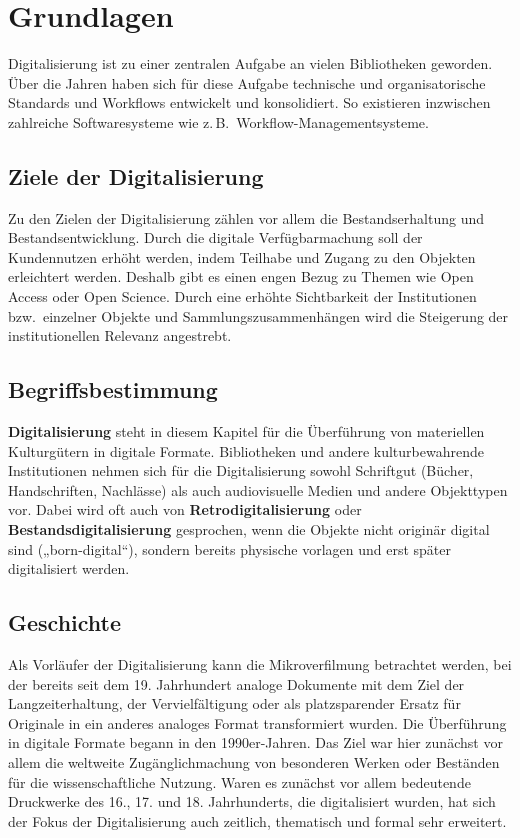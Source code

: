 \documentclass[
  11pt,
  letterpaper,
  DIV=11,
  twoside]{scrreprt}
\begin{document}
\section{Grundlagen}\label{grundlagen}

Digitalisierung ist zu einer zentralen Aufgabe an vielen Bibliotheken
geworden. Über die Jahren haben sich für diese Aufgabe technische und
organisatorische Standards und Workflows entwickelt und konsolidiert. So
existieren inzwischen zahlreiche Softwaresysteme wie
z.\,B.~Workflow-Managementsysteme.

\subsection{Ziele der Digitalisierung}\label{ziele-der-digitalisierung}

Zu den Zielen der Digitalisierung zählen vor allem die Bestandserhaltung
und Bestandsentwicklung. Durch die digitale Verfügbarmachung soll der
Kundennutzen erhöht werden, indem Teilhabe und Zugang zu den Objekten
erleichtert werden. Deshalb gibt es einen engen Bezug zu Themen wie Open
Access oder Open Science. Durch eine erhöhte Sichtbarkeit der
Institutionen bzw.~einzelner Objekte und Sammlungszusammenhängen wird
die Steigerung der institutionellen Relevanz angestrebt.

\subsection{Begriffsbestimmung}\label{begriffsbestimmung}

\textbf{Digitalisierung} steht in diesem Kapitel für die Überführung von
materiellen Kulturgütern in digitale Formate. Bibliotheken und andere
kulturbewahrende Institutionen nehmen sich für die Digitalisierung
sowohl Schriftgut (Bücher, Handschriften, Nachlässe) als auch
audiovisuelle Medien und andere Objekttypen vor. Dabei wird oft auch von
\textbf{Retrodigitalisierung} oder \textbf{Bestandsdigitalisierung}
gesprochen, wenn die Objekte nicht originär digital sind
(„born-digital``), sondern bereits physische vorlagen und erst später
digitalisiert werden.

\subsection{Geschichte}\label{geschichte}

Als Vorläufer der Digitalisierung kann die Mikroverfilmung betrachtet
werden, bei der bereits seit dem 19. Jahrhundert analoge Dokumente mit
dem Ziel der Langzeiterhaltung, der Vervielfältigung oder als
platzsparender Ersatz für Originale in ein anderes analoges Format
transformiert wurden. Die Überführung in digitale Formate begann in den
1990er-Jahren. Das Ziel war hier zunächst vor allem die weltweite
Zugänglichmachung von besonderen Werken oder Beständen für die
wissenschaftliche Nutzung. Waren es zunächst vor allem bedeutende
Druckwerke des 16., 17. und 18. Jahrhunderts, die digitalisiert wurden,
hat sich der Fokus der Digitalisierung auch zeitlich, thematisch und
formal sehr erweitert.
\end{document}
